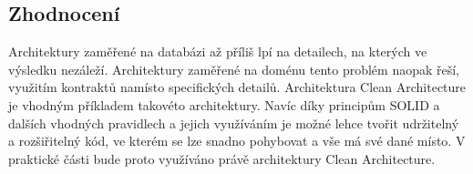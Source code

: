 \subsection{Zhodnocení}

Architektury zaměřené na databázi až příliš lpí na detailech,
na kterých ve výsledku nezáleží.
Architektury zaměřené na doménu tento problém naopak řeší,
využitím kontraktů namísto specifických detailů.
Architektura Clean Architecture je vhodným příkladem takovéto architektury.
Navíc díky principům SOLID a dalších vhodných pravidlech a jejich využíváním
je možné lehce tvořit udržitelný a rozšiřitelný kód,
ve kterém se lze snadno pohybovat a vše má své dané místo.
V praktické části bude proto využíváno právě architektury Clean Architecture.
